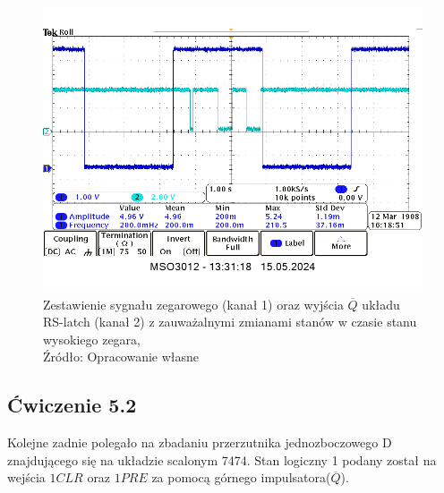 \documentclass{article}
\begin{document}
        \begin{figure}[!ht]
          \centering
          \includegraphics[scale=0.35]{grafiki/5.1_CLK_Q.png}
          \caption{Zestawienie sygnału zegarowego (kanał 1) oraz wyjścia $\overline{Q}$ układu RS-latch (kanał 2) z zauważalnymi zmianami stanów w czasie stanu wysokiego zegara,
          \\Źródło: Opracowanie własne}
        \end{figure}

    \subsection{Ćwiczenie 5.2}
      Kolejne zadnie polegało na zbadaniu przerzutnika jednozboczowego D 
      znajdującego się na układzie scalonym 7474. Stan logiczny 1 podany został na wejścia $1CLR$ oraz $1PRE$ za pomocą górnego impulsatora($\overline{Q}$).
\end{document}

